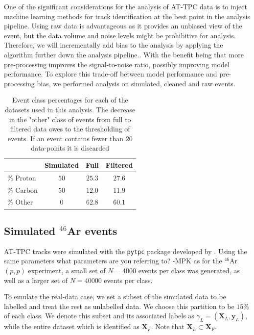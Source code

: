\documentclass[review,number,sort&compress]{elsarticle}
\begin{document}
One of the significant considerations for the analysis of AT-TPC data is to inject machine learning methods for track identification at the best point in the analysis pipeline.
Using raw data is advantageous as it provides an unbiased view of the event, but the data volume and noise levels might be prohibitive for analysis.
Therefore, we will incrementally add bias to the analysis by applying the algorithm further down the analysis pipeline.. With the benefit being that more pre-processing improves the signal-to-noise ratio, possibly improving model performance.
To explore this trade-off between model performance and pre-processing bias, we performed analysis on simulated, cleaned and raw events.

\begin{table}
\centering
\caption{Event class percentages for each of the datasets used in this analysis. The decrease in the "other" class of events from full to filtered data owes to the thresholding of events. If an event contains fewer than $20$ data-points it is discarded }\label{tab:class_distr}
\begin{tabular}{lccc}
\toprule
{} & Simulated & Full & Filtered \\
\midrule
$\%$ Proton & $50$ & $25.3$ & $27.6$ \\ 
$\%$ Carbon & $50$ & $12.0$ & $11.9$ \\
$\%$ Other & $0$ & $62.8$ & $60.1$ \\
\end{tabular}
\end{table}

\subsection{Simulated \texorpdfstring{${}^{46}$Ar}{46Ar}  events}\label{sec:data_sim}

AT-TPC tracks were simulated with the \lstinline{pytpc} package developed by \citet{Bradt2017a}. Using the same parameters {\color{blue} what parameters are you referring to? -MPK} as for the ${}^{46}$Ar$(p, p)$ experiment, a small set of $N=4000$ events per class was generated, as well as a larger set of $N=40000$ events per class. 

To emulate the real-data case, we set a subset of the simulated data to be labelled and treat the rest as unlabelled data. We choose this partition to be $15\%$ of each class. We denote this subset and its associated labels as $\gamma_L=(\boldsymbol{X}_L, \boldsymbol{y}_L)$, while the entire dataset which is identified as $\boldsymbol{X}_F$. Note that $\boldsymbol{X}_L \subset \boldsymbol{X}_F$.
\end{document}
